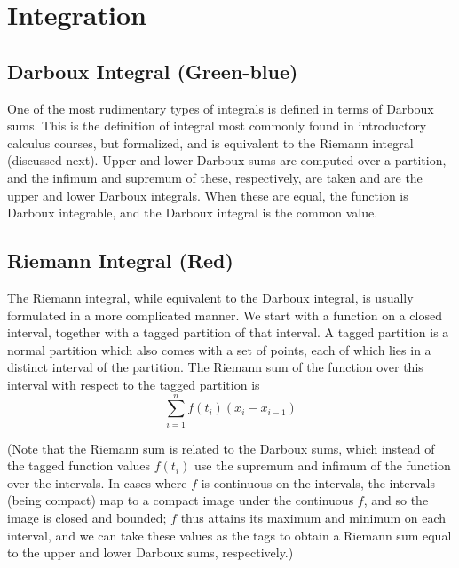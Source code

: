 \chapter{Integration}

\section{Darboux Integral (Green-blue)}
One of the most rudimentary types of integrals is defined in terms of Darboux sums. This is the definition of integral most commonly found in introductory calculus courses, but formalized, and is equivalent to the Riemann integral (discussed next). Upper and lower Darboux sums are computed over a partition, and the infimum and supremum of these, respectively, are taken and are the upper and lower Darboux integrals. When these are equal, the function is Darboux integrable, and the Darboux integral is the common value.



\section{Riemann Integral (Red)}
The Riemann integral, while equivalent to the Darboux integral, is usually formulated in a more complicated manner. We start with a function on a closed interval, together with a tagged partition of that interval. A tagged partition is a normal partition which also comes with a set of points, each of which lies in a distinct interval of the partition. The Riemann sum of the function over this interval with respect to the tagged partition is $$ \sum_{i=1}^n f\left(t_i\right)\left(x_{i}-x_{i-1}\right) $$

(Note that the Riemann sum is related to the Darboux sums, which instead of the tagged function values $f\left(t_i\right)$ use the supremum and infimum of the function over the intervals. In cases where $f$ is continuous on the intervals, the intervals (being compact) map to a compact image under the continuous $f$, and so the image is closed and bounded; $f$ thus attains its maximum and minimum on each interval, and we can take these values as the tags to obtain a Riemann sum equal to the upper and lower Darboux sums, respectively.)

